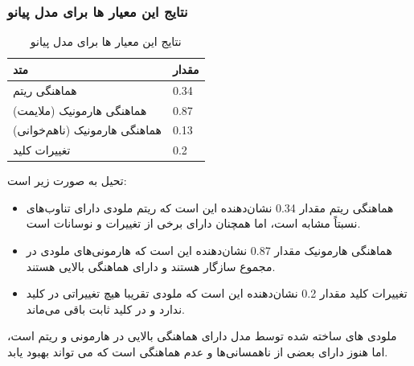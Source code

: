 \subsubsection{نتایج این معیار ها برای مدل پیانو}
\begin{table}
      \centering
      \caption{نتایج این معیار ها برای مدل پیانو}
      \label{resultPi}
      \begin{tabular}{|l|l|}
            \hline
            متد                          & مقدار \\ \hline
            هماهنگی ریتم                 & 0.34  \\ \hline
            هماهنگی هارمونیک (ملایمت)    & 0.87  \\ \hline
            هماهنگی هارمونیک (نا‌هم‌خوانی) & 0.13  \\ \hline
            تغییرات کلید                 & 0.2   \\ \hline
      \end{tabular}
\end{table}
تحیل   به صورت زیر است:
\begin{itemize}
      \item{هماهنگی ریتم} مقدار 0.34 نشان‌دهنده این است که ریتم ملودی دارای تناوب‌های نسبتاً مشابه است، اما همچنان دارای برخی از تغییرات و نوسانات است.
      \item{هماهنگی هارمونیک} مقدار 0.87 نشان‌دهنده این است که هارمونی‌های ملودی در مجموع سازگار هستند و دارای هماهنگی بالایی هستند.
      \item{تغییرات کلید} مقدار 0.2 نشان‌دهنده این است که ملودی تقریبا هیچ تغییراتی در کلید ندارد و در کلید ثابت باقی می‌ماند.
\end{itemize}

ملودی های ساخته شده توسط مدل دارای هماهنگی بالایی در هارمونی و ریتم است، اما هنوز دارای بعضی از ناهمسانی‌ها و عدم هماهنگی است که می تواند بهبود یابد.

